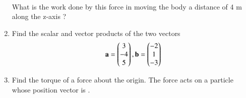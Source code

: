 \begin{enumerate}[label=\arabic*.,ref=\thesubsection.\theenumi]
\begin{align}
\end{align}
%
What is the work done by this force in moving the body a distance of 4 m along the z-axis ?
\item Find the scalar and vector products of the two vectors
\begin{align}
\mathbf{a} = \begin{pmatrix}3\\-4\\5\end{pmatrix}, 
\mathbf{b} = \begin{pmatrix}-2\\1\\-3\end{pmatrix}
\end{align}
%
\item Find the torque of a force 
about the origin. The force
acts on a particle whose position vector is .
\end{enumerate}
%
